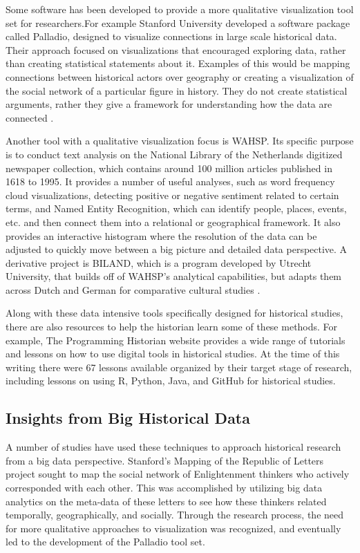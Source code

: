 \documentclass[sigconf]{acmart}
\begin{document}
Some software has been developed to provide a more qualitative visualization tool set for researchers.For example Stanford University developed a software package called Palladio, designed to visualize connections in large scale historical data. Their approach focused on visualizations that encouraged exploring data, rather than creating statistical statements about it. Examples of this would be mapping connections between historical actors over geography or creating a visualization of the social network of a particular figure in history. They do not create statistical arguments, rather they give a framework for understanding how the data are connected \cite{palladio}.

Another tool with a qualitative visualization focus is WAHSP. Its specific purpose is to conduct text analysis on the National Library of the Netherlands digitized newspaper collection, which contains around 100 million articles published in 1618 to 1995. It provides a number of useful analyses, such as word frequency cloud visualizations, detecting positive or negative sentiment related to certain terms, and Named Entity Recognition, which can identify people, places, events, etc. and then connect them into a relational or geographical framework. It also provides an interactive histogram where the resolution of the data can be adjusted to quickly move between a big picture and detailed data perspective. A derivative project is BILAND, which is a program developed by Utrecht University, that builds off of WAHSP's analytical capabilities, but adapts them across Dutch and German for comparative cultural studies \cite{bdglobalhist}.

Along with these data intensive tools specifically designed for historical studies, there are also resources to help the historian learn some of these methods. For example, The Programming Historian website provides a wide range of tutorials and lessons on how to use digital tools in historical studies. At the time of this writing there were 67 lessons available organized by their target stage of research, including lessons on using R, Python, Java, and GitHub for historical studies\cite{proghistabout}.

\subsection{Insights from Big Historical Data}

A number of studies have used these techniques to approach historical research from a big data perspective. Stanford's Mapping of the Republic of Letters project sought to map the social network of Enlightenment thinkers who actively corresponded with each other. This was accomplished by utilizing big data analytics on the meta-data of these letters to see how these thinkers related temporally, geographically, and socially. Through the research process, the need for more qualitative approaches to visualization was recognized, and eventually led to the development of the Palladio tool set. 
\end{document}
